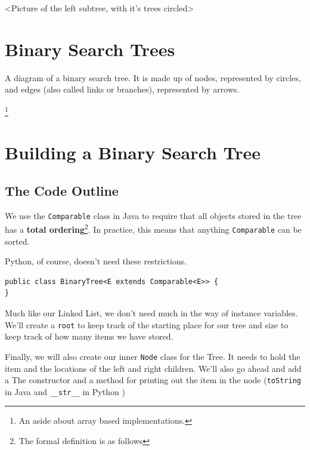 \documentclass[10pt,a4paper]{book}
\begin{document}
<Picture of the left subtree, with it's trees circled>




















\section{Binary Search Trees}

A diagram of a binary search tree.  It is made up of nodes, represented by circles, and edges (also called links or branches), represented by arrows.  


\footnote{An aside about array based implementations.}

\section{Building a Binary Search Tree}

\subsection{The Code Outline}


We use the \texttt{Comparable} class in Java to require that all objects stored in the tree has a \textbf{total ordering}\footnote{The formal definition is as follows}.%
In practice, this means that anything \texttt{Comparable} can be sorted.

Python, of course, doesn't need these restrictions.
\begin{verbatim}
public class BinaryTree<E extends Comparable<E>> {
}
\end{verbatim}




Much like our Linked List, we don't need much in the way of instance variables.  We'll create a \texttt{root} to keep track of the starting place for our tree and size to keep track of how many items we have stored.

Finally, we will also create our inner \texttt{Node} class for the Tree.
It needs to hold the item and the locations of the left and right children.
We'll also go ahead and add a The constructor and a method for printing out the item in the node (\texttt{toString} in Java and \texttt{\_\_str\_\_} in Python )
\end{document}
